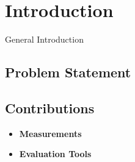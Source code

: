 
\chapter{Introduction}
\label{chap:introduction}

General Introduction


\section{Problem Statement}
\label{sec:intro:probstatement}

\section{Contributions}
\label{sec:intro:contrib}


\begin{itemize}
\item {\bf Measurements}
\item{\bf Evaluation Tools}

\end{itemize}
